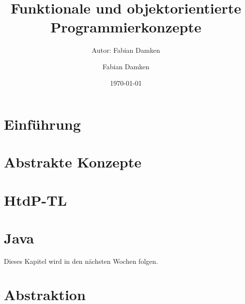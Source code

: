 \documentclass[a4paper, 11pt, accentcolor = tud3b]{tudreport}
\title{Funktionale und objektorientierte Programmierkonzepte}
\subtitle{Autor: Fabian Damken}
\author{Fabian Damken}
\date{\today}
\providecommand{\racket}{HtdP-TL}
\begin{document}
	

    \maketitle
    \tableofcontents
    \listoftodos


    \chapter{Einführung}
	    \label{c:einfuehrung}
    
        

	\chapter{Abstrakte Konzepte}
		\label{c:abstrakte_konzepte}
	
		

    \chapter{\racket}
	    \label{c:racket}
    
        

    
    \chapter{Java}
    	\label{c:java}
    	
    	Dieses Kapitel wird in den nächsten Wochen folgen.
    
    \chapter{Abstraktion}
	    \label{c:abstraktion}
    
	    
    

    
    
\end{document}
